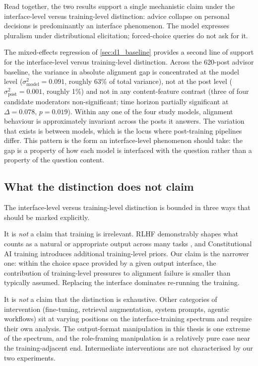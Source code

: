 Read together, the two results support a single mechanistic claim
under the interface-level versus training-level distinction: advice
collapse on personal decisions is predominantly an interface
phenomenon. The model expresses pluralism under distributional
elicitation; forced-choice queries do not ask for it.

The mixed-effects regression of \cref{sec:d1_baseline} provides a
second line of support for the interface-level versus training-level
distinction. Across the 620-post advisor baseline, the variance in
absolute alignment gap is concentrated at the model level
($\sigma^2_{\text{model}} = 0.091$, roughly 63\% of total variance),
not at the post level ($\sigma^2_{\text{post}} = 0.001$, roughly
1\%) and not in any content-feature contrast (three of four candidate
moderators non-significant; time horizon partially significant at
$\Delta = 0.078$, $p = 0.019$). Within any one of the four study
models, alignment behaviour is approximately invariant across the
posts it answers. The variation that exists is between models, which
is the locus where post-training pipelines differ. This pattern is
the form an interface-level phenomenon should take: the gap is a
property of how each model is interfaced with the question rather
than a property of the question content.

\subsection{What the distinction does not claim}
\label{sec:disc_not_claim}

The interface-level versus training-level distinction is bounded in
three ways that should be marked explicitly.

It is \emph{not} a claim that training is irrelevant. RLHF
demonstrably shapes what counts as a natural or appropriate output
across many tasks \citep{kirk-2024-rlhf-diversity}, and Constitutional
AI training \citep{bai-2022-constitutional} introduces additional
training-level priors. Our claim is the narrower one: within the
choice space provided by a given output interface, the contribution of
training-level pressures to alignment failure is smaller than typically
assumed. Replacing the interface dominates re-running the training.

It is \emph{not} a claim that the distinction is exhaustive. Other
categories of intervention (fine-tuning, retrieval augmentation,
system prompts, agentic workflows) sit at varying positions on the
interface-training spectrum and require their own analysis. The
output-format manipulation in this thesis is one extreme of the
spectrum, and the role-framing manipulation is a relatively pure case
near the training-adjacent end. Intermediate interventions are not
characterised by our two experiments.

